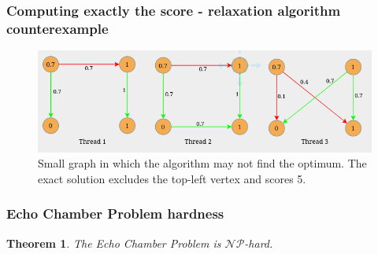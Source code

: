 \documentclass{beamer}
\newtheorem{theorem}{Theorem}
\begin{document}
\begin{frame}[c]
	\frametitle{Computing exactly the score - relaxation algorithm counterexample}
	\begin{figure}[htpb]
		\centering
		\includegraphics[width=0.8\linewidth]{img/counterexample.png}
		\caption{Small graph in which the algorithm may not find the
			optimum. The exact solution excludes the top-left vertex and scores
			5.}%
		\label{fig:img/counterexample}
	\end{figure}

\end{frame}

\begin{frame}[c]
	\frametitle{Echo Chamber Problem hardness}

	\begin{theorem}
		The Echo Chamber Problem is $\mathcal{NP}$-hard.
	\end{theorem}

\end{frame}
\end{document}
